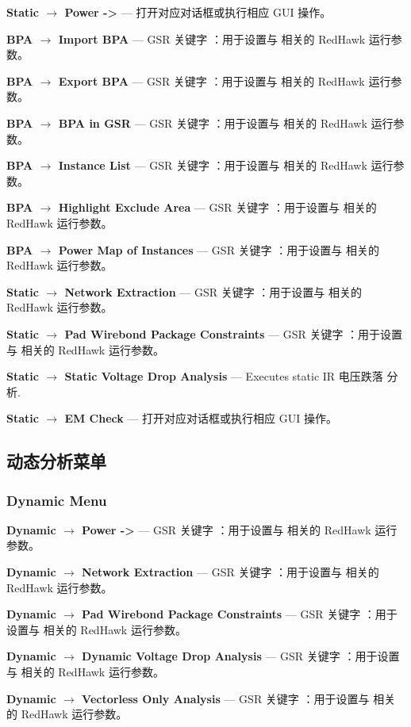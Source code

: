\textbf{Static $\rightarrow$ Power ->} — 打开对应对话框或执行相应 GUI 操作。

\textbf{BPA $\rightarrow$ Import BPA} — GSR 关键字 ：用于设置与  相关的 RedHawk 运行参数。

\textbf{BPA $\rightarrow$ Export BPA} — GSR 关键字 ：用于设置与  相关的 RedHawk 运行参数。

\textbf{BPA $\rightarrow$ BPA in GSR} — GSR 关键字 ：用于设置与  相关的 RedHawk 运行参数。

\textbf{BPA $\rightarrow$ Instance List} — GSR 关键字 ：用于设置与  相关的 RedHawk 运行参数。

\textbf{BPA $\rightarrow$ Highlight Exclude Area} — GSR 关键字 ：用于设置与  相关的 RedHawk 运行参数。

\textbf{BPA $\rightarrow$ Power Map of Instances} — GSR 关键字 ：用于设置与  相关的 RedHawk 运行参数。

\textbf{Static $\rightarrow$ Network Extraction} — GSR 关键字 ：用于设置与  相关的 RedHawk 运行参数。

\textbf{Static $\rightarrow$ Pad Wirebond Package Constraints} — GSR 关键字 ：用于设置与  相关的 RedHawk 运行参数。

\textbf{Static $\rightarrow$ Static Voltage Drop Analysis} — Executes static IR 电压跌落 分析.

\textbf{Static $\rightarrow$ EM Check} — 打开对应对话框或执行相应 GUI 操作。

\subsection{动态分析菜单}
\subsubsection*{Dynamic Menu}

\textbf{Dynamic $\rightarrow$ Power ->} — GSR 关键字 ：用于设置与  相关的 RedHawk 运行参数。

\textbf{Dynamic $\rightarrow$ Network Extraction} — GSR 关键字 ：用于设置与  相关的 RedHawk 运行参数。

\textbf{Dynamic $\rightarrow$ Pad Wirebond Package Constraints} — GSR 关键字 ：用于设置与  相关的 RedHawk 运行参数。

\textbf{Dynamic $\rightarrow$ Dynamic Voltage Drop Analysis} — GSR 关键字 ：用于设置与  相关的 RedHawk 运行参数。

\textbf{Dynamic $\rightarrow$ Vectorless Only Analysis} — GSR 关键字 ：用于设置与  相关的 RedHawk 运行参数。

